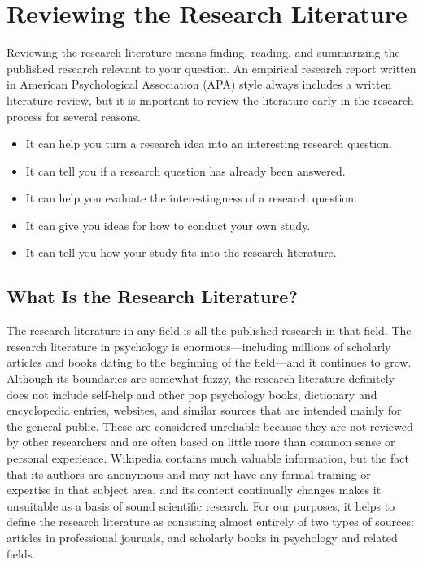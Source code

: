 \documentclass[]{book}
\theoremstyle{definition}
\theoremstyle{definition}
\theoremstyle{remark}
\begin{document}
\section{Reviewing the Research
Literature}\label{reviewing-the-research-literature}

Reviewing the research literature means finding, reading, and
summarizing the published research relevant to your question. An
empirical research report written in American Psychological Association
(APA) style always includes a written literature review, but it is
important to review the literature early in the research process for
several reasons.

\begin{itemize}
\item
  It can help you turn a research idea into an interesting research
  question.
\item
  It can tell you if a research question has already been answered.
\item
  It can help you evaluate the interestingness of a research question.
\item
  It can give you ideas for how to conduct your own study.
\item
  It can tell you how your study fits into the research literature.
\end{itemize}

\subsection{What Is the Research
Literature?}\label{what-is-the-research-literature}

The research literature in any field is all the published research in
that field. The research literature in psychology is
enormous---including millions of scholarly articles and books dating to
the beginning of the field---and it continues to grow. Although its
boundaries are somewhat fuzzy, the research literature definitely does
not include self-help and other pop psychology books, dictionary and
encyclopedia entries, websites, and similar sources that are intended
mainly for the general public. These are considered unreliable because
they are not reviewed by other researchers and are often based on little
more than common sense or personal experience. Wikipedia contains much
valuable information, but the fact that its authors are anonymous and
may not have any formal training or expertise in that subject area, and
its content continually changes makes it unsuitable as a basis of sound
scientific research. For our purposes, it helps to define the research
literature as consisting almost entirely of two types of sources:
articles in professional journals, and scholarly books in psychology and
related fields.
\end{document}
